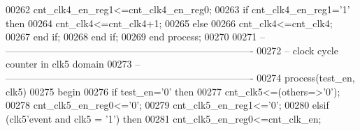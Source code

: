 \begin{DoxyCode}
00262             \textcolor{vhdlchar}{cnt_clk4_en_reg1}\textcolor{vhdlchar}{<=}\textcolor{vhdlchar}{cnt_clk4_en_reg0};
00263           \textcolor{keywordflow}{if} \textcolor{vhdlchar}{cnt_clk4_en_reg1}\textcolor{vhdlchar}{=}\textcolor{vhdlchar}{'}\textcolor{vhdllogic}{}\textcolor{vhdllogic}{1}\textcolor{vhdlchar}{'} \textcolor{keywordflow}{then} 
00264                 \textcolor{vhdlchar}{cnt_clk4}\textcolor{vhdlchar}{<=}\textcolor{vhdlchar}{cnt_clk4}\textcolor{vhdlchar}{+}\textcolor{vhdllogic}{}\textcolor{vhdllogic}{1};
00265             \textcolor{keywordflow}{else} 
00266                 \textcolor{vhdlchar}{cnt_clk4}\textcolor{vhdlchar}{<=}\textcolor{vhdlchar}{cnt_clk4};
00267             \textcolor{keywordflow}{end} \textcolor{keywordflow}{if};
00268         \textcolor{keywordflow}{end} \textcolor{keywordflow}{if};
00269     \textcolor{keywordflow}{end} \textcolor{keywordflow}{process};
00270 
00271 \textcolor{keyword}{-- ----------------------------------------------------------------------------}
00272 \textcolor{keyword}{-- clock cycle counter in clk5 domain}
00273 \textcolor{keyword}{-- ----------------------------------------------------------------------------}
00274   \textcolor{keywordflow}{process}(test_en, clk5)
00275 \textcolor{vhdlkeyword}{    begin}
00276       \textcolor{keywordflow}{if} \textcolor{vhdlchar}{test_en}\textcolor{vhdlchar}{=}\textcolor{vhdlchar}{'}\textcolor{vhdllogic}{}\textcolor{vhdllogic}{0}\textcolor{vhdlchar}{'} \textcolor{keywordflow}{then}
00277             \textcolor{vhdlchar}{cnt_clk5}\textcolor{vhdlchar}{<=}\textcolor{vhdlchar}{(}\textcolor{keywordflow}{others}\textcolor{vhdlchar}{=}\textcolor{vhdlchar}{>}\textcolor{vhdlchar}{'}\textcolor{vhdllogic}{}\textcolor{vhdllogic}{0}\textcolor{vhdlchar}{'}\textcolor{vhdlchar}{)}; 
00278             \textcolor{vhdlchar}{cnt_clk5_en_reg0}\textcolor{vhdlchar}{<=}\textcolor{vhdlchar}{'}\textcolor{vhdllogic}{}\textcolor{vhdllogic}{0}\textcolor{vhdlchar}{'};
00279             \textcolor{vhdlchar}{cnt_clk5_en_reg1}\textcolor{vhdlchar}{<=}\textcolor{vhdlchar}{'}\textcolor{vhdllogic}{}\textcolor{vhdllogic}{0}\textcolor{vhdlchar}{'};
00280         \textcolor{keywordflow}{elsif} \textcolor{vhdlchar}{(}\textcolor{vhdlchar}{clk5}\textcolor{vhdlchar}{'}\textcolor{vhdlkeyword}{event} \textcolor{keywordflow}{and} \textcolor{vhdlchar}{clk5} \textcolor{vhdlchar}{=} \textcolor{vhdlchar}{'}\textcolor{vhdllogic}{}\textcolor{vhdllogic}{1}\textcolor{vhdlchar}{'}\textcolor{vhdlchar}{)} \textcolor{keywordflow}{then}
00281             \textcolor{vhdlchar}{cnt_clk5_en_reg0}\textcolor{vhdlchar}{<=}\textcolor{vhdlchar}{cnt_clk_en};

\end{DoxyCode}
